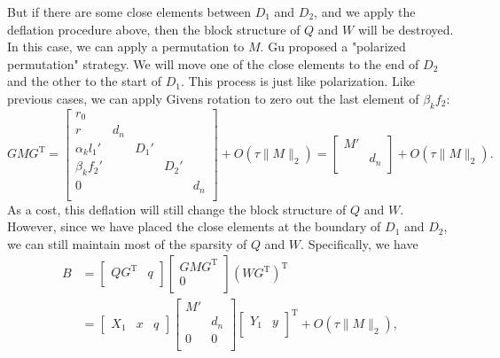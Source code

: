 \documentclass[12pt]{article}
\newcommand{\op}{\operatorname}
\begin{document}
But if there are some close elements between \(D_1\) and \(D_2\), and we apply the deflation procedure above, then the block structure of \(Q\) and \(W\) will be destroyed. In this case, we can apply a permutation to \(M\). Gu proposed a "polarized permutation" strategy. We will move one of the close elements to the end of \(D_2\) and the other to the start of \(D_1\). This process is just like polarization. Like previous cases, we can apply Givens rotation to zero out the last element of \(\beta_k f_2\):
\[
    G M G^{\op T} = \begin{bmatrix}
        r_0 \\
        r & d_n \\
        \alpha_k l_1' & & D_1' \\
        \beta_k f_2' & &  & D_2' \\
        0 & & & & d_n \\
    \end{bmatrix} + O(\tau \|M\|_2) = \begin{bmatrix}
        M' \\
        & d_n \\
    \end{bmatrix} + O(\tau \|M\|_2).
\]
As a cost, this deflation will still change the block structure of \(Q\) and \(W\). However, since we have placed the close elements at the boundary of \(D_1\) and \(D_2\), we can still maintain most of the sparsity of \(Q\) and \(W\). Specifically, we have
\[
    \begin{aligned}
        B &= \begin{bmatrix}
        Q G^{\op T} & q \\
    \end{bmatrix}
    \begin{bmatrix}
        G M G^{\op T} \\
        0 \\
    \end{bmatrix}
    (W G^{\op T})^{\op T} \\
    &= \begin{bmatrix}
        X_1 & x & q
    \end{bmatrix}
    \begin{bmatrix}
        M' \\
        & d_n \\
        0 & 0 \\
    \end{bmatrix}
    \begin{bmatrix}
        Y_1 & y \\
    \end{bmatrix}^{\op T} + O(\tau \|M\|_2),
    \end{aligned}
\]
\end{document}
